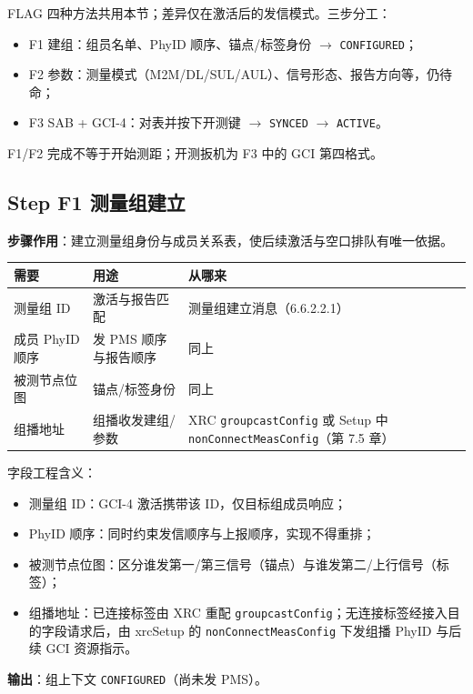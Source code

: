 \documentclass[11pt,a4paper]{ctexart}
\begin{document}
FLAG 四种方法共用本节；差异仅在激活后的发信模式。三步分工：
\begin{itemize}[nosep]
  \item F1 建组：组员名单、PhyID 顺序、锚点/标签身份 $\rightarrow$ \texttt{CONFIGURED}；
  \item F2 参数：测量模式（M2M/DL/SUL/AUL）、信号形态、报告方向等，仍待命；
  \item F3 SAB + GCI-4：对表并按下开测键 $\rightarrow$ \texttt{SYNCED} $\rightarrow$ \texttt{ACTIVE}。
\end{itemize}
F1/F2 完成不等于开始测距；开测扳机为 F3 中的 GCI 第四格式。

\subsection{Step F1 测量组建立}

\textbf{步骤作用}：建立测量组身份与成员关系表，使后续激活与空口排队有唯一依据。

\begin{table}[h]
\centering
\small
\begin{tabular}{L{3.2cm}L{5.2cm}L{4.5cm}}
\toprule
\textbf{需要} & \textbf{用途} & \textbf{从哪来} \\
\midrule
测量组 ID & 激活与报告匹配 & 测量组建立消息（6.6.2.2.1） \\
成员 PhyID 顺序 & 发 PMS 顺序与报告顺序 & 同上 \\
被测节点位图 & 锚点/标签身份 & 同上 \\
组播地址 & 组播收发建组/参数 & XRC \texttt{groupcastConfig} 或 Setup 中 \texttt{nonConnectMeasConfig}（第 7.5 章） \\
\bottomrule
\end{tabular}
\end{table}

字段工程含义：
\begin{itemize}[nosep]
  \item 测量组 ID：GCI-4 激活携带该 ID，仅目标组成员响应；
  \item PhyID 顺序：同时约束发信顺序与上报顺序，实现不得重排；
  \item 被测节点位图：区分谁发第一/第三信号（锚点）与谁发第二/上行信号（标签）；
  \item 组播地址：已连接标签由 XRC 重配 \texttt{groupcastConfig}；无连接标签经接入目的字段请求后，由 xrcSetup 的 \texttt{nonConnectMeasConfig} 下发组播 PhyID 与后续 GCI 资源指示。
\end{itemize}

\textbf{输出}：组上下文 \texttt{CONFIGURED}（尚未发 PMS）。
\end{document}
